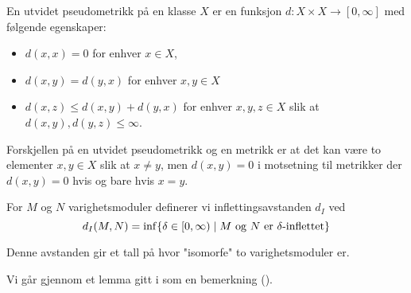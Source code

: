 \begin{definisjon}\label{def:UtPsMet}
   En utvidet pseudometrikk på en klasse $X$ er en
   funksjon $d: X\times X\to [0,\infty]$ med følgende
   egenskaper:
   \begin{itemize}
     \item $d(x,x) = 0$ for enhver $x\in X$,
     \item $d(x,y) = d(y,x)$ for enhver $x,y\in X$
     \item $d(x,z) \leq d(x,y) + d(y,x)$ for enhver
       $x,y,z\in X$ slik at $d(x,y),d(y,z)\leq\infty$.
   \end{itemize}
\end{definisjon}

Forskjellen på en utvidet pseudometrikk og en metrikk er
at det kan være to elementer $x,y\in X$ slik at $x\neq y$,
men $d(x,y)=0$ i motsetning til metrikker der $d(x,y)=0$
hvis og bare hvis $x=y$.

\begin{definisjon}\label{Def:InfAvs}
	For $M$ og $N$ varighetsmoduler definerer vi inflettingsavstanden $d_I$ ved
	\[d_I(M,N) = \inf\{\delta\in [0,\infty)\mid \text{$M$ og $N$ er $\delta$-inflettet}\}\]
\end{definisjon}
Denne avstanden gir et tall på hvor "isomorfe" to varighetsmoduler er.

Vi går gjennom et lemma gitt i \cite{Bauer2015a} som en bemerkning (\cite[Remark 3.1]{Bauer2015a}).

